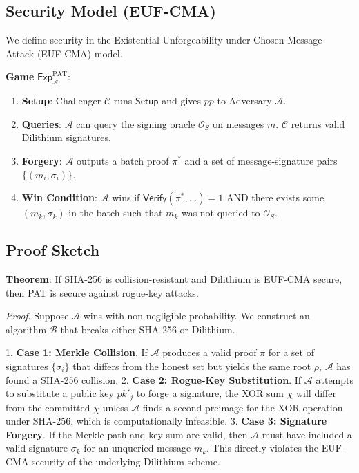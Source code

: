 \documentclass[10pt]{article}
\begin{document}
\subsection{Security Model (EUF-CMA)}
We define security in the Existential Unforgeability under Chosen Message Attack (EUF-CMA) model.

\textbf{Game} $\mathsf{Exp}_{\mathcal{A}}^{\text{PAT}}$:
\begin{enumerate}
    \item \textbf{Setup}: Challenger $\mathcal{C}$ runs $\mathsf{Setup}$ and gives $pp$ to Adversary $\mathcal{A}$.
    \item \textbf{Queries}: $\mathcal{A}$ can query the signing oracle $\mathcal{O}_S$ on messages $m$. $\mathcal{C}$ returns valid Dilithium signatures.
    \item \textbf{Forgery}: $\mathcal{A}$ outputs a batch proof $\pi^*$ and a set of message-signature pairs $\{(m_i, \sigma_i)\}$.
    \item \textbf{Win Condition}: $\mathcal{A}$ wins if $\mathsf{Verify}(\pi^*, \dots) = 1$ AND there exists some $(m_k, \sigma_k)$ in the batch such that $m_k$ was not queried to $\mathcal{O}_S$.
\end{enumerate}

\subsection{Proof Sketch}
\textbf{Theorem}: If SHA-256 is collision-resistant and Dilithium is EUF-CMA secure, then PAT is secure against rogue-key attacks.

\textit{Proof}. Suppose $\mathcal{A}$ wins with non-negligible probability. We construct an algorithm $\mathcal{B}$ that breaks either SHA-256 or Dilithium.

1.  \textbf{Case 1: Merkle Collision}. If $\mathcal{A}$ produces a valid proof $\pi$ for a set of signatures $\{\sigma_i\}$ that differs from the honest set but yields the same root $\rho$, $\mathcal{A}$ has found a SHA-256 collision.
2.  \textbf{Case 2: Rogue-Key Substitution}. If $\mathcal{A}$ attempts to substitute a public key $pk'_j$ to forge a signature, the XOR sum $\chi$ will differ from the committed $\chi$ unless $\mathcal{A}$ finds a second-preimage for the XOR operation under SHA-256, which is computationally infeasible.
3.  \textbf{Case 3: Signature Forgery}. If the Merkle path and key sum are valid, then $\mathcal{A}$ must have included a valid signature $\sigma_k$ for an unqueried message $m_k$. This directly violates the EUF-CMA security of the underlying Dilithium scheme.
\end{document}
